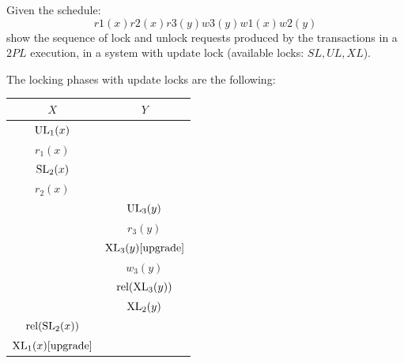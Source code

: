 \documentclass[12pt, a4paper]{report}
\newtheorem[style=M,bodystyle=\normalfont]{theorem}{Theorem}
\newtheorem[style=M,bodystyle=\normalfont]{corollary}{Corollary}
\newtheorem[style=M,bodystyle=\normalfont]{lemma}{Lemma}
\newtheorem[style=M,bodystyle=\normalfont]{definition}{Definition}
\begin{document}
    \begin{Exercise}[label=11]
        Given the schedule:
        \[r1(x) r2(x) r3(y) w3(y) w1(x) w2(y)\]
        show the sequence of lock and unlock requests produced by the transactions in a $2PL$ execution, in a system with update lock (available locks: $SL, UL, XL$).
    \end{Exercise}
    \begin{Answer}[ref=11]
        The locking phases with update locks are the following: 
        \begin{table}[H]
            \centering
            \begin{tabular}{|c|c|}
            \hline
            $X$                                           & $Y$                                           \\ \hline
            $\textnormal{UL}_1(x)$                        &                                               \\
            $r_1(x)$                                      &                                               \\
            $\textnormal{SL}_2(x)$                        &                                               \\
            $r_2(x)$                                      &                                               \\
                                                          & $\textnormal{UL}_3(y)$                        \\
                                                          & $r_3(y)$                                      \\
                                                          & $\textnormal{XL}_3(y) [\textnormal{upgrade}]$ \\
                                                          & $w_3(y)$                                      \\
                                                          & $\textnormal{rel}(\textnormal{XL}_3(y))$      \\
                                                          & $\textnormal{XL}_2(y)$                        \\
            $\textnormal{rel}(\textnormal{SL}_2(x))$      &                                               \\
            $\textnormal{XL}_1(x) [\textnormal{upgrade}]$ &                                               \\

\end{tabular}
\end{table}
\end{Answer}
\end{document}
